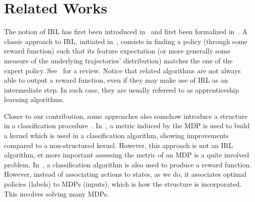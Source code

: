 \documentclass[english,utf8]{./hermes-journal}
\begin{document}

\section{Related Works}
\label{sec:relatedWorks}

The notion of IRL has first been introduced in~\cite{Russell:1998}
and first been formalized in~\cite{Ng:2000}. A classic approach to
IRL, initiated in~\cite{Abbeel:2004}, consists in finding a policy
(through some reward function) such that its feature expectation (or
more generally some measure of the underlying trajectories'
distribution) matches the one of the expert policy.
%
See~\cite{Neu:2010} for a review.
%
%
Notice that related algorithms are not always able to output a
reward function, even if they may make use of IRL as an intermediate
step. In such case, they are usually refereed to as apprenticeship
learning algorithms.
%

Closer to our contribution, some approaches also somehow introduce a
structure in a classification
procedure~\cite{Melo:2010}\cite{Ratliff:2006}. In~\cite{Melo:2010},
a metric induced by the MDP is used to build a kernel which is used
in a classification algorithm, showing improvements compared to a
non-structured kernel. However, this approach is not an IRL
algorithm, et more important assessing the metric of an MDP is a
quite involved problem. In~\cite{Ratliff:2006}, a classification
algorithm is also used to produce a reward function. However,
instead of associating actions to states, as we do, it associates
optimal policies (labels) to MDPs (inputs), which is how the
structure is incorporated. This involves solving many MDPs.
\end{document}
